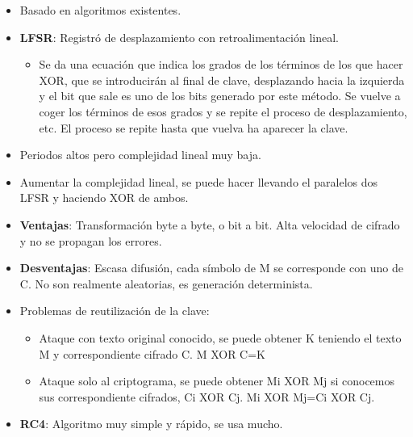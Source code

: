 \documentclass[12pt, twoside, openright]{report} %
\begin{document}
\begin{itemize}
    \begin{itemize}
    \item Basado en algoritmos existentes.
      
    \item \textbf{LFSR}: Registró de desplazamiento con retroalimentación
      lineal.
      

      \begin{itemize}
      \item Se da una ecuación que indica los grados de los términos de los
        que hacer XOR, que se introducirán al final de clave,
        desplazando hacia la izquierda y el bit que sale es uno de los
        bits generado por este método. Se vuelve a coger los términos de
        esos grados y se repite el proceso de desplazamiento, etc. El
        proceso se repite hasta que vuelva ha aparecer la clave.
        
      \end{itemize}
    \item Periodos altos pero complejidad lineal muy baja.
      
    \item Aumentar la complejidad lineal, se puede hacer llevando el
      paralelos dos LFSR y haciendo XOR de ambos.
      
    \item \textbf{Ventajas}: Transformación byte a byte, o bit a bit. Alta
      velocidad de cifrado y no se propagan los errores.
      
    \item \textbf{Desventajas}: Escasa difusión, cada símbolo de M se
      corresponde con uno de C. No son realmente aleatorias, es
      generación determinista.
      
    \item Problemas de reutilización de la clave:
      

      \begin{itemize}
      \item Ataque con texto original conocido, se puede obtener K teniendo
        el texto M y correspondiente cifrado C. M XOR C=K
        
      \item Ataque solo al criptograma, se puede obtener Mi XOR Mj si
        conocemos sus correspondiente cifrados, Ci XOR Cj. Mi XOR Mj=Ci
        XOR Cj.
        
      \end{itemize}
    \item \textbf{RC4}: Algoritmo muy simple y rápido, se usa mucho.
      


\end{itemize}
\end{itemize}
\end{document}
